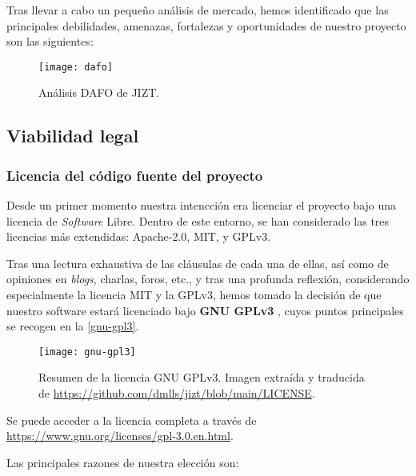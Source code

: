 Tras llevar a cabo un pequeño análisis de mercado, hemos identificado que las principales debilidades, amenazas, fortalezas y oportunidades de nuestro proyecto son las siguientes:

\begin{figure}[h]
	\centering
	\texttt{[image: dafo]}
	\vspace{-1.1cm}
	\caption{Análisis DAFO de JIZT.}
\end{figure}

\subsection{Viabilidad legal}

\subsubsection{Licencia del código fuente del proyecto}

Desde un primer momento nuestra intencción era licenciar el proyecto bajo una licencia de \emph{Software} Libre. Dentro de este entorno, se han considerado las tres licencias más extendidas: Apache-2.0, MIT, y GPLv3.

Tras una lectura exhaustiva de las cláusulas de cada una de ellas, así como de opiniones en \emph{blogs}, charlas, foros, etc., y tras una profunda reflexión, considerando especialmente la licencia MIT y la GPLv3, hemos tomado la decisión de que nuestro software estará licenciado bajo \textbf{GNU GPLv3} \cite{gplv3}, cuyos puntos principales se recogen en la \autoref{gnu-gpl3}.

\begin{figure}[h]
	\centering
	\texttt{[image: gnu-gpl3]}
	\vspace{-0.5cm}
	\caption[Resumen de la licencia GNU GPLv3]{Resumen de la licencia GNU GPLv3. Imagen extraída y traducida de \href{https://github.com/dmlls/jizt/blob/main/LICENSE}{https://github.com/dmlls/jizt/blob/main/LICENSE}.}
	\label{gnu-gpl3}
\end{figure}

Se puede acceder a la licencia completa a través de \href{https://www.gnu.org/licenses/gpl-3.0.en.html}{https://www.gnu.org/\newline licenses/gpl-3.0.en.html}.

Las principales razones de nuestra elección son:

